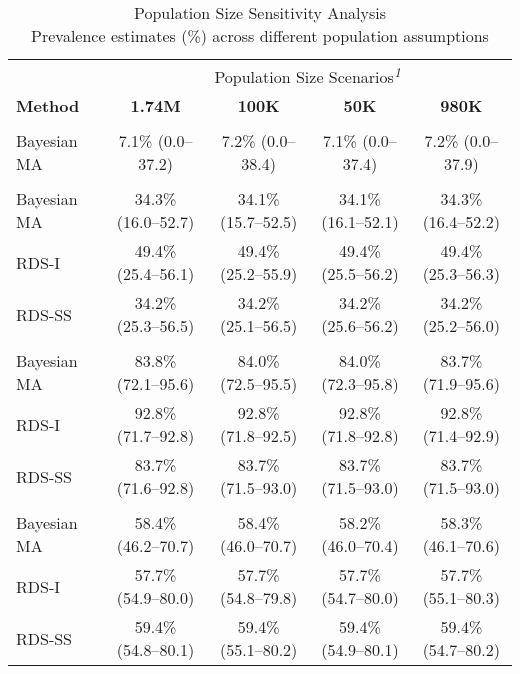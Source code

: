 \begin{table}[t]
\caption*{
{\large Population Size Sensitivity Analysis} \\ 
{\small Prevalence estimates (\%) across different population assumptions}
} 
\fontsize{8.2pt}{9.9pt}\selectfont
\begin{tabular*}{\linewidth}{@{\extracolsep{\fill}}lcccc}
\toprule
 & \multicolumn{4}{c}{Population Size Scenarios\textsuperscript{\textit{1}}} \\ 
\cmidrule(lr){2-5}
{\bfseries Method} & {\bfseries 1.74M} & {\bfseries 100K} & {\bfseries 50K} & {\bfseries 980K} \\ 
\midrule\addlinespace[2.5pt]
\multicolumn{5}{l}{{\bfseries Composite risk score}} \\[2.5pt] 
\midrule\addlinespace[2.5pt]
Bayesian MA & 7.1\% (0.0–37.2) & 7.2\% (0.0–38.4) & 7.1\% (0.0–37.4) & 7.2\% (0.0–37.9) \\ 
\midrule\addlinespace[2.5pt]
\multicolumn{5}{l}{{\bfseries Document withholding}} \\[2.5pt] 
\midrule\addlinespace[2.5pt]
Bayesian MA & 34.3\% (16.0–52.7) & 34.1\% (15.7–52.5) & 34.1\% (16.1–52.1) & 34.3\% (16.4–52.2) \\ 
RDS-I & 49.4\% (25.4–56.1) & 49.4\% (25.2–55.9) & 49.4\% (25.5–56.2) & 49.4\% (25.3–56.3) \\ 
RDS-SS & 34.2\% (25.3–56.5) & 34.2\% (25.1–56.5) & 34.2\% (25.6–56.2) & 34.2\% (25.2–56.0) \\ 
\midrule\addlinespace[2.5pt]
\multicolumn{5}{l}{{\bfseries Excessive working hours}} \\[2.5pt] 
\midrule\addlinespace[2.5pt]
Bayesian MA & 83.8\% (72.1–95.6) & 84.0\% (72.5–95.5) & 84.0\% (72.3–95.8) & 83.7\% (71.9–95.6) \\ 
RDS-I & 92.8\% (71.7–92.8) & 92.8\% (71.8–92.5) & 92.8\% (71.8–92.8) & 92.8\% (71.4–92.9) \\ 
RDS-SS & 83.7\% (71.6–92.8) & 83.7\% (71.5–93.0) & 83.7\% (71.5–93.0) & 83.7\% (71.5–93.0) \\ 
\midrule\addlinespace[2.5pt]
\multicolumn{5}{l}{{\bfseries Limited access to help}} \\[2.5pt] 
\midrule\addlinespace[2.5pt]
Bayesian MA & 58.4\% (46.2–70.7) & 58.4\% (46.0–70.7) & 58.2\% (46.0–70.4) & 58.3\% (46.1–70.6) \\ 
RDS-I & 57.7\% (54.9–80.0) & 57.7\% (54.8–79.8) & 57.7\% (54.7–80.0) & 57.7\% (55.1–80.3) \\ 
RDS-SS & 59.4\% (54.8–80.1) & 59.4\% (55.1–80.2) & 59.4\% (54.9–80.1) & 59.4\% (54.7–80.2) \\ 

\end{tabular*}
\end{table}
